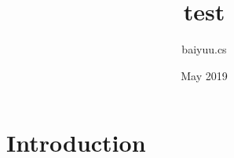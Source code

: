 \documentclass{article}
\title{test}
\author{baiyuu.cs }
\date{May 2019}
\begin{document}
\maketitle

\section{Introduction}
\end{document}
